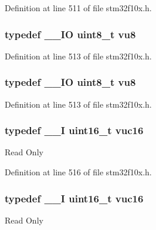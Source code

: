 Definition at line 511 of file stm32f10x.\+h.

\subsubsection[{\texorpdfstring{vu8}{vu8}}]{\setlength{\rightskip}{0pt plus 5cm}typedef {\bf \+\_\+\+\_\+\+IO} {\bf uint8\+\_\+t} {\bf vu8}}\hypertarget{group___exported__types_ga4a8fa9a2b4796540a6d65a04eb18e111}{}\label{group___exported__types_ga4a8fa9a2b4796540a6d65a04eb18e111}


Definition at line 513 of file stm32f10x.\+h.

\subsubsection[{\texorpdfstring{vu8}{vu8}}]{\setlength{\rightskip}{0pt plus 5cm}typedef {\bf \+\_\+\+\_\+\+IO} {\bf uint8\+\_\+t} {\bf vu8}}\hypertarget{group___exported__types_ga4a8fa9a2b4796540a6d65a04eb18e111}{}\label{group___exported__types_ga4a8fa9a2b4796540a6d65a04eb18e111}


Definition at line 513 of file stm32f10x.\+h.

\subsubsection[{\texorpdfstring{vuc16}{vuc16}}]{\setlength{\rightskip}{0pt plus 5cm}typedef {\bf \+\_\+\+\_\+I} {\bf uint16\+\_\+t} {\bf vuc16}}\hypertarget{group___exported__types_ga7f6037565f0caa27727c8b871daf0d56}{}\label{group___exported__types_ga7f6037565f0caa27727c8b871daf0d56}
Read Only 

Definition at line 516 of file stm32f10x.\+h.

\subsubsection[{\texorpdfstring{vuc16}{vuc16}}]{\setlength{\rightskip}{0pt plus 5cm}typedef {\bf \+\_\+\+\_\+I} {\bf uint16\+\_\+t} {\bf vuc16}}\hypertarget{group___exported__types_ga7f6037565f0caa27727c8b871daf0d56}{}\label{group___exported__types_ga7f6037565f0caa27727c8b871daf0d56}
Read Only 

